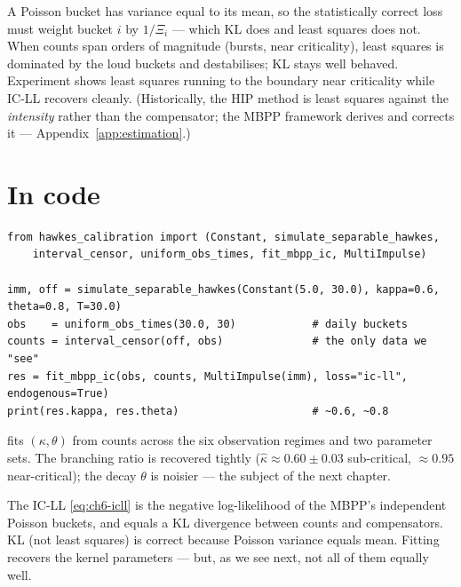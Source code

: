 \begin{whybox}
A Poisson bucket has variance equal to its mean, so the statistically correct loss
must weight bucket $i$ by $1/\Xi_i$ --- which KL does and least squares does not.
When counts span orders of magnitude (bursts, near criticality), least squares is
dominated by the loud buckets and destabilises; KL stays well behaved. Experiment
 shows least squares running to the boundary near criticality while
IC-LL recovers cleanly. (Historically, the HIP method is least squares against the
\emph{intensity} rather than the compensator; the MBPP framework derives and
corrects it --- Appendix~\ref{app:estimation}.)
\end{whybox}

\section{In code}

\begin{lstlisting}[caption={Fitting the branching ratio and decay from counts.}]
from hawkes_calibration import (Constant, simulate_separable_hawkes,
    interval_censor, uniform_obs_times, fit_mbpp_ic, MultiImpulse)

imm, off = simulate_separable_hawkes(Constant(5.0, 30.0), kappa=0.6, theta=0.8, T=30.0)
obs    = uniform_obs_times(30.0, 30)            # daily buckets
counts = interval_censor(off, obs)              # the only data we "see"
res = fit_mbpp_ic(obs, counts, MultiImpulse(imm), loss="ic-ll", endogenous=True)
print(res.kappa, res.theta)                     # ~0.6, ~0.8
\end{lstlisting}

\begin{examplebox}
 fits $(\kappa,\theta)$ from counts across the six
observation regimes and two parameter sets. The branching ratio is recovered
tightly ($\hat\kappa\approx0.60\pm0.03$ sub-critical, $\approx0.95$
near-critical); the decay $\theta$ is noisier --- the subject of the next chapter.
\end{examplebox}

\begin{recap}
The IC-LL \eqref{eq:ch6-icll} is the negative log-likelihood of the MBPP's
independent Poisson buckets, and equals a KL divergence between counts and
compensators. KL (not least squares) is correct because Poisson variance equals
mean. Fitting recovers the kernel parameters --- but, as we see next, not all of
them equally well.
\end{recap}

